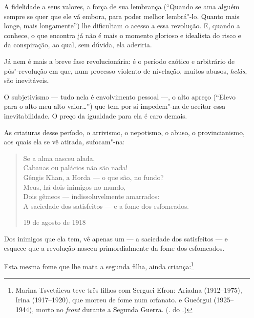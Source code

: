 A fidelidade a seus valores, a força de sua lembrança (``Quando se
ama alguém sempre se quer que ele vá embora, para poder melhor
lembrá"-lo. Quanto mais longe, mais longamente'') lhe dificultam
o acesso a essa revolução. E, quando a conhece, o que encontra já
não é mais o momento glorioso e idealista do risco e da conspiração,
ao qual, sem dúvida, ela aderiria.

Já nem é mais a breve fase revolucionária: é o período caótico e
arbitrário de pós"-revolução em que, num processo violento de nivelação,
muitos abusos, \emph{helás}, são inevitáveis.

O subjetivismo --- tudo nela é envolvimento pessoal ---, o alto apreço
(``Elevo para o alto meu alto valor\ldots{}'')
que tem por si impedem"-na de aceitar essa inevitabilidade. O preço da igualdade
para ela é caro demais.

As criaturas desse período, o arrivismo, o nepotismo, o abuso, o
provincianismo, aos quais ela se vê atirada, sufocam"-na:

\begin{verse}
Se a alma nasceu alada, \\
Cabanas ou palácios não são nada! \\
Gêngis Khan, a Horda --- o que são, no fundo? \\[8pt]
Meus, há dois inimigos no mundo, \\
Dois gêmeos --- indissoluvelmente amarrados: \\
A saciedade dos satisfeitos --- e a fome \qb{}dos esfomeados. 

19 de agosto de 1918

\end{verse}

Dos inimigos que ela tem, vê apenas um --- a saciedade dos
satisfeitos --- e esquece que a revolução nasceu primordialmente
da fome dos esfomeados.

Esta mesma fome que lhe mata a segunda filha, ainda
criança:\footnote{Marina Tsvetáieva teve três filhos com
Serguei Efron: Ariadna (1912--1975), Irina (1917--1920), que
morreu de fome num orfanato. e Gueórgui (1925--1944), morto
no \emph{front} durante a Segunda Guerra. (. do
.)}


